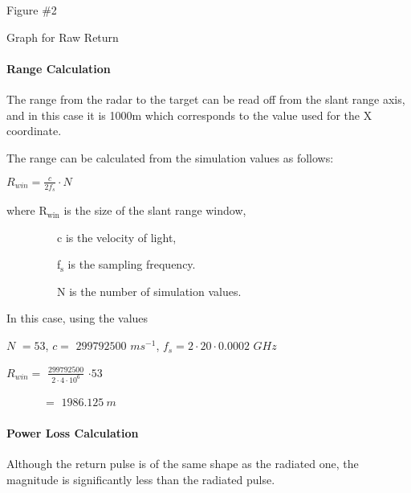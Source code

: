 \documentclass{sebase}
\begin{document}
\smallskip

\smallskip Figure \#2

\smallskip

Graph for Raw Return

\smallskip

\smallskip

\smallskip

\smallskip

\smallskip

\smallskip

\smallskip

\smallskip

\smallskip

\paragraph{\protect\smallskip Range Calculation}

\smallskip

The range from the radar to the target can be read off from the slant range
axis, and in this case it is 1000m which corresponds to the value used for
the X coordinate.\smallskip

\smallskip The range can be calculated from the simulation values as follows:

$R_{win}=\frac{c}{2f_{s}}\cdot N$

where R$_{\text{win}}$ is the size of the slant range window,

\ \ \ \ \ \ \ \ \ c is the velocity of light,

\ \ \ \ \ \ \ \ \ f$_{\text{s}}$ is the sampling frequency.

\ \ \ \ \ \ \ \ \ N is the number of simulation values.

In this case, using the values

$N$ $=53$, $c=$ $299792500$ $ms^{-1}$, $f_{s}=2\cdot 20\cdot 0.0002$ $GHz$

\smallskip

$R_{win}=$ $\frac{299792500}{2\cdot 4\cdot 10^{6}}$ $\cdot 53$

\ \ \ \ \ \ $\ =$ $1986.125\ m$

\smallskip

\paragraph{Power Loss Calculation}

\smallskip

Although the return pulse is of the same shape as the radiated one, the
magnitude is significantly less than the radiated pulse.
\end{document}
